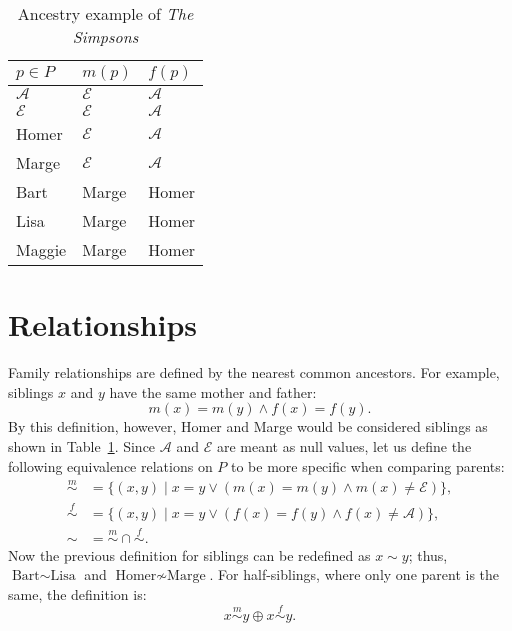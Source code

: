\documentclass[letterpaper]{article}
\begin{document}
\begin{table}
    \centering
    \begin{tabular}{lll}
        \toprule
        \(p \in P\)     & \(m(p)\)        & \(f(p)\)        \\
        \midrule
        \(\mathcal{A}\) & \(\mathcal{E}\) & \(\mathcal{A}\) \\
        \(\mathcal{E}\) & \(\mathcal{E}\) & \(\mathcal{A}\) \\
        Homer           & \(\mathcal{E}\) & \(\mathcal{A}\) \\
        Marge           & \(\mathcal{E}\) & \(\mathcal{A}\) \\
        Bart            & Marge           & Homer           \\
        Lisa            & Marge           & Homer           \\
        Maggie          & Marge           & Homer           \\
        \bottomrule
    \end{tabular}
    \caption{Ancestry example of \textit{The Simpsons}}\label{table:simpsons}
\end{table}

\section{Relationships}

Family relationships are defined by the nearest common ancestors.
For example, siblings \(x\) and \(y\) have the same mother and father:
\[
    m(x) = m(y) \land f(x) = f(y).
\]
By this definition, however, Homer and Marge would be considered siblings as shown in Table~\ref{table:simpsons}.
Since \(\mathcal{A}\) and \(\mathcal{E}\) are meant as null values, let us define the following equivalence relations on \(P\) to be more specific when comparing parents:
\[
    \begin{aligned}
        {\overset{m}{\sim}} & = \{(x, y) \mid x = y \lor (m(x) = m(y) \land m(x) \neq \mathcal{E})\}, \\
        {\overset{f}{\sim}} & = \{(x, y) \mid x = y \lor (f(x) = f(y) \land f(x) \neq \mathcal{A})\}, \\
        {\sim}              & = {\overset{m}{\sim}} \cap {\overset{f}{\sim}}.
    \end{aligned}
\]
Now the previous definition for siblings can be redefined as \(x \sim y\); thus, \(\text{Bart} \sim \text{Lisa}\) and \(\text{Homer} \nsim \text{Marge}\).
For half-siblings, where only one parent is the same, the definition is:
\[
    x \overset{m}{\sim} y \oplus x \overset{f}{\sim} y.
\]
\end{document}

